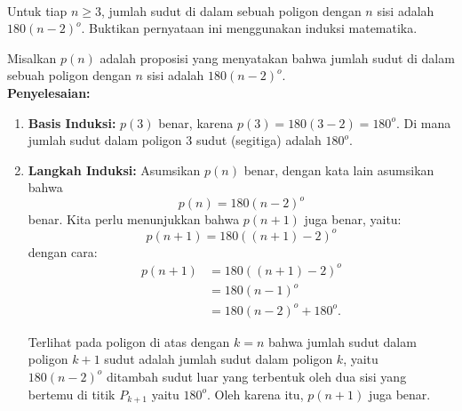 \documentclass[11pt]{article}
\theoremstyle{definitionstyle}
\theoremstyle{theoremstyle}
\theoremstyle{examplestyle}
\begin{document}
\begin{example} \hfill \\
    Untuk tiap $n \ge 3$, jumlah sudut di dalam sebuah poligon dengan $n$ sisi adalah $180(n-2)^o$. Buktikan pernyataan ini menggunakan induksi matematika.
\end{example}
Misalkan $p(n)$ adalah proposisi yang menyatakan bahwa jumlah sudut di dalam sebuah poligon dengan $n$ sisi adalah $180(n-2)^o$. \\
\textbf{Penyelesaian: }
\begin{enumerate}[left=0pt, itemsep=1.5pt, topsep=1.5pt, label=\roman*), leftmargin=1.5em]
    \item \textbf{Basis Induksi:} $p(3)$ benar, karena $p(3) = 180(3-2) = 180^o$. Di mana jumlah sudut dalam poligon 3 sudut (segitiga) adalah $180^o$.
    \item \textbf{Langkah Induksi: } Asumsikan $p(n)$ benar, dengan kata lain asumsikan bahwa
    $$p(n) = 180(n-2)^o$$
    benar. Kita perlu menunjukkan bahwa $p(n+1)$ juga benar, yaitu:
    $$p(n+1) = 180((n + 1) - 2)^o$$
    dengan cara:
    \begin{align*}
        p(n+1) &= 180((n + 1) - 2)^o \\
        &= 180(n - 1)^o \\
        &= 180(n - 2)^o + 180^o.
    \end{align*}
    \begin{center}
    \end{center}
    Terlihat pada poligon di atas dengan $k = n$ bahwa jumlah sudut dalam poligon $k + 1$ sudut adalah jumlah sudut dalam poligon $k$, yaitu $180(n-2)^o$ ditambah sudut luar yang terbentuk oleh dua sisi yang bertemu di titik $P_{k+1}$ yaitu $180^o$. Oleh karena itu, $p(n + 1)$ juga benar. \\
\end{enumerate}
\end{document}
